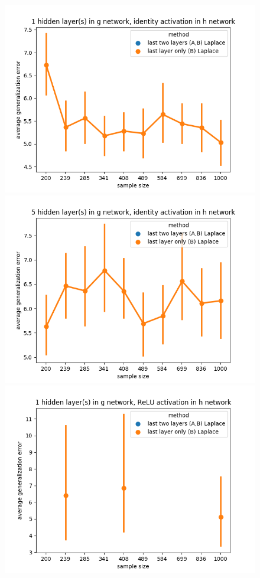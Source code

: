 \documentclass[11pt]{article}
\numberwithin{equation}{section}
\theoremstyle{plain}
\theoremstyle{definition}
\begin{document}
\begin{figure}[t!]
	\begin{center}
		\includegraphics[scale=0.45]{laplace_taskid12.png}
		\includegraphics[scale=0.45]{laplace_taskid13.png}
		\includegraphics[scale=0.45]{laplace_taskid14.png}

\end{center}
\end{figure}
\end{document}
